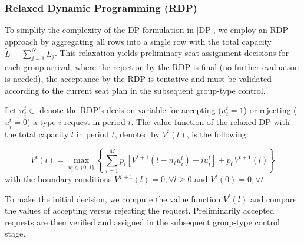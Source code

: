 
\subsubsection{Relaxed Dynamic Programming (RDP)}
To simplify the complexity of the DP formulation in \eqref{DP}, we employ an RDP approach by aggregating all rows into a single row with the total capacity $\tilde{L} = \sum_{j=1}^{N} L_j$. This relaxation yields preliminary seat assignment decisions for each group arrival, where the rejection by the RDP is final (no further evaluation is needed), the acceptance by the RDP is tentative and must be validated according to the current seat plan in the subsequent group-type control.

Let $u_{i}^{t} \in $ denote the RDP's decision variable for accepting ($u_{i}^{t} = 1$) or rejecting ($u_{i}^{t} = 0$) a type $i$ request in period $t$. The value function of the relaxed DP with the total capacity $l$ in period $t$, denoted by $V^{t}(l)$, is the following:

\begin{equation}\label{DP_relaxed}
V^{t}(l) =  \max_{u_{i}^{t} \in \{0,1\}} \left\{ \sum_{i=1}^{M} p_i \left[V^{t+1}(l-n_i u_{i}^{t})+ i u_{i}^{t}\right] + p_0 V^{t+1}(l)\right\}
\end{equation}
with the boundary conditions $V^{T+1}(l) =0, \forall l \geq 0$ and $V^{t}(0) =0, \forall t$.


To make the initial decision, we compute the value function $V^{t}(l)$ and compare the values of accepting versus rejecting the request. Preliminarily accepted requests are then verified and assigned in the subsequent group-type control stage.






